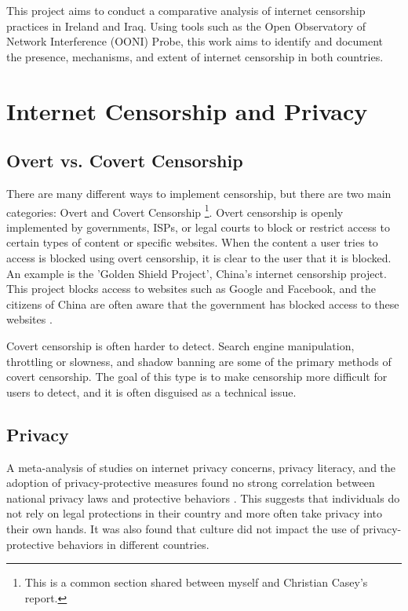 This project aims to conduct a comparative analysis of internet censorship practices in Ireland and Iraq. Using tools such as the Open Observatory of Network Interference (OONI) Probe, this work aims to identify and document the presence, mechanisms, and extent of internet censorship in both countries.

\section{Internet Censorship and Privacy}

\subsection{Overt vs. Covert Censorship}
\label{sec:Chris-Overt-Covert}

There are many different ways to implement censorship, but there are two main categories: Overt and Covert Censorship \cite{OvertVsCovert}\footnote{This is a common section shared between myself and Christian Casey’s report.}. Overt censorship is openly implemented by governments, ISPs, or legal courts to block or restrict access to certain types of content or specific websites. When the content a user tries to access is blocked using overt censorship, it is clear to the user that it is blocked. An example is the 'Golden Shield Project', China's internet censorship project. This project blocks access to websites such as Google and Facebook, and the citizens of China are often aware that the government has blocked access to these websites \cite{standfordGreatFirewallOfChina}.

Covert censorship is often harder to detect. Search engine manipulation, throttling or slowness, and shadow banning are some of the primary methods of covert censorship. The goal of this type is to make censorship more difficult for users to detect, and it is often disguised as a technical issue.

\subsection{Privacy} 

A meta-analysis of studies on internet privacy concerns, privacy literacy, and the adoption of privacy-protective measures found no strong correlation between national privacy laws and protective behaviors \cite{baruh2017online}. This suggests that individuals do not rely on legal protections in their country and more often take privacy into their own hands. It was also found that culture did not impact the use of privacy-protective behaviors in different countries. 

